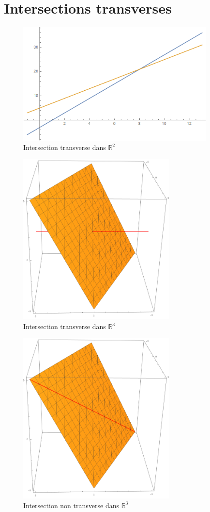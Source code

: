\documentclass[a4paper]{article}
\newcommand{\R}{\mathbb{R}}
\theoremstyle{definition}
\begin{document}
\section{Intersections transverses}
\begin{figure}[H]
	\includegraphics[width=10cm,keepaspectratio]{images/2DTransverse.png}
	\caption{Intersection transverse dans $\R^2$}
\end{figure}
\begin{figure}[H]
	\includegraphics[width=8cm,keepaspectratio]{images/3D_trans.png}
	\caption{Intersection transverse dans $\R^3$}
\end{figure}
\begin{figure}[H]
	\includegraphics[width=8cm,keepaspectratio]{images/3D_non_trans.png}
	\caption{Intersection non transverse dans $\R^3$}
\end{figure}
\end{document}
